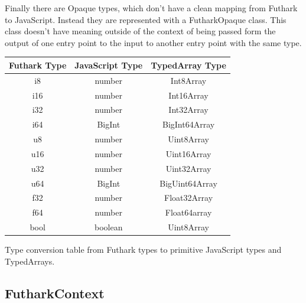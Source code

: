 \documentclass[11pt]{book}
\begin{document}
Finally there are Opaque types, which don't have a clean mapping from Futhark to JavaScript. Instead they are represented with a FutharkOpaque class. This class doesn't have meaning outside of the context of being passed form the output of one entry point to the input to another entry point with the same type.

\begin{listing}[H] 
\begin{table}[H]
\centering

\begin{tabular}{|c|c|c|}
\hline
\textbf{Futhark Type} & \textbf{JavaScript Type} & \textbf{TypedArray Type} \\ \hline
i8                    & number                   & Int8Array                \\ \hline
i16                   & number                   & Int16Array               \\ \hline
i32                   & number                   & Int32Array               \\ \hline
i64                   & BigInt                   & BigInt64Array            \\ \hline
u8                    & number                   & Uint8Array               \\ \hline
u16                   & number                   & Uint16Array              \\ \hline
u32                   & number                   & Uint32Array              \\ \hline
u64                   & BigInt                   & BigUint64Array           \\ \hline
f32                   & number                   & Float32Array             \\ \hline
f64                   & number                   & Float64array             \\ \hline
bool                  & boolean                  & Uint8Array               \\ \hline
\end{tabular}
\end{table}
\caption{Type conversion table from Futhark types to primitive JavaScript types and TypedArrays.}
\label{table:types}
\end{listing}


\subsection*{FutharkContext}
\end{document}
